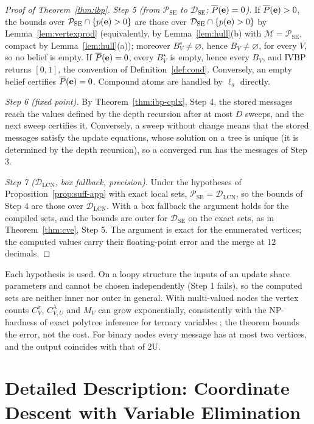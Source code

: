 \documentclass{article} %
\newcommand{\DSE}{\mathcal{D}_{\mathrm{SE}}}
\newcommand{\DLCN}{\mathcal{D}_{\mathrm{LCN}}}
\begin{document}
\begin{proof}[Proof of Theorem~\ref{thm:ibp}]
\emph{Step 5 (from $\mathcal P_{\mathrm{SE}}$ to $\DSE$; $\overline P(\mathbf{e})=0$).} If
$\overline P(\mathbf{e})>0$, the bounds over $\mathcal P_{\mathrm{SE}}\cap\{p(\mathbf{e})>0\}$ are those
over $\DSE\cap\{p(\be)>0\}$ by Lemma~\ref{lem:vertexprod} (equivalently, by
Lemma~\ref{lem:hull}(b) with $\mathcal M=\mathcal P_{\mathrm{SE}}$, compact by
Lemma~\ref{lem:hull}(a)); moreover $B^\star_V\ne\varnothing$, hence $B_V\ne\varnothing$, for
every $V$, so no belief is empty. If $\overline P(\mathbf{e})=0$, every $B^\star_V$ is empty, hence
every $B_V$, and IVBP returns $[0,1]$, the convention of Definition~\ref{def:cond}. Conversely,
an empty belief certifies $\overline P(\mathbf{e})=0$. Compound atoms are handled by $\ell_a$
directly.

\emph{Step 6 (fixed point).} By Theorem~\ref{thm:ibp-cplx}, Step 4, the stored messages reach
the values defined by the depth recursion after at most $D$ sweeps, and the next sweep
certifies it. Conversely, a sweep without change means that the stored messages satisfy the
update equations, whose solution on a tree is unique (it is determined by the depth
recursion), so a converged run has the messages of Step 3.

\emph{Step 7 ($\DLCN$, box fallback, precision).} Under the hypotheses of
Proposition~\ref{prop:suff-app} with exact local sets, $\mathcal P_{\mathrm{SE}}=\DLCN$, so
the bounds of Step 4 are those over $\DLCN$. With a box fallback the argument holds for the
compiled sets, and the bounds are outer for $\DSE$ on the exact sets, as in
Theorem~\ref{thm:cve}, Step 5. The argument is exact for the enumerated vertices; the
computed values carry their floating-point error and the merge at $12$ decimals.
\end{proof}

Each hypothesis is used. On a loopy structure the inputs of an update share
parameters and cannot be chosen independently (Step 1 fails), so the computed sets are
neither inner nor outer in general. With multi-valued nodes the vertex counts
$C^\pi_V$, $C^\lambda_{V,U}$ and $M_V$ can grow exponentially, consistently with the
NP-hardness of exact polytree inference for ternary variables \citep{maua2014jair}; the
theorem bounds the error, not the cost. For binary nodes every message has at most two
vertices, and the output coincides with that of 2U.

\section{Detailed Description: Coordinate Descent with Variable Elimination}
\label{sec-full-cdve}
\end{document}
